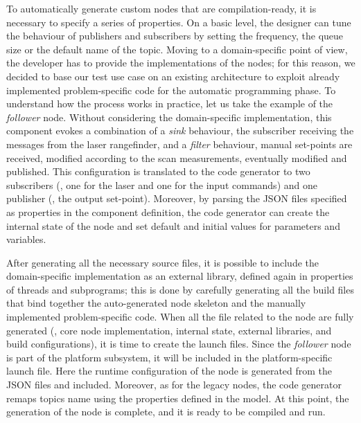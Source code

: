 To automatically generate custom nodes that are compilation-ready, it is necessary to specify a series of properties. On a basic level, the designer can tune the behaviour of publishers and subscribers by setting the frequency, the queue size or the default name of the topic. Moving to a domain-specific point of view, the developer has to provide the implementations of the nodes; for this reason, we decided to base our test use case on an existing architecture to exploit already implemented problem-specific code for the automatic programming phase. To understand how the process works in practice, let us take the example of the \textit{follower} node. Without considering the domain-specific implementation, this component evokes a combination of a \textit{sink} behaviour, the subscriber receiving the messages from the laser rangefinder, and a \textit{filter} behaviour, manual set-points are received, modified according to the scan measurements, eventually modified and published. This configuration is translated to the code generator to two subscribers (\ie, one for the laser and one for the input commands) and one publisher (\ie, the output set-point). Moreover, by parsing the JSON files specified as properties in the component definition, the code generator can create the internal state of the node and set default and initial values for parameters and variables. 

After generating all the necessary source files, it is possible to include the domain-specific implementation as an external library, defined again in properties of threads and subprograms; this is done by carefully generating all the build files that bind together the auto-generated node skeleton and the manually implemented problem-specific code. When all the file related to the node are fully generated (\ie, core node implementation, internal state, external libraries, and build configurations), it is time to create the launch files. Since the \textit{follower} node is part of the platform subsystem, it will be included in the platform-specific launch file. Here the runtime configuration of the node is generated from the JSON files and included. Moreover, as for the legacy nodes, the code generator remaps topics name using the properties defined in the model. At this point, the generation of the node is complete, and it is ready to be compiled and run.

